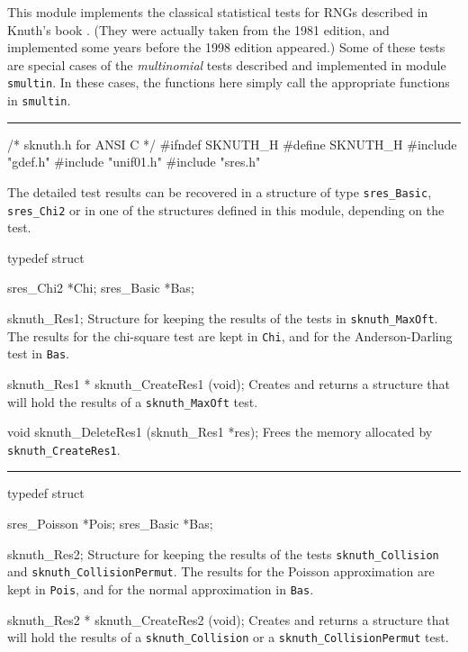 
This module implements the classical statistical tests for RNGs
described in Knuth's book \cite{rKNU81a}.
(They were actually taken from the 1981 edition, and implemented
some years before the 1998 edition \cite{rKNU98a} appeared.)
Some of these tests are special cases of the {\em multinomial\/}
tests described and implemented in module {\tt smultin}.
In these cases, the functions here simply call the appropriate
functions in {\tt smultin}.
\resdef

\bigskip\hrule

\code\hide
/* sknuth.h  for ANSI C */
#ifndef SKNUTH_H
#define SKNUTH_H
\endhide
#include "gdef.h"
#include "unif01.h"
#include "sres.h"
\endcode


\ifdetailed  %


The detailed test results can be recovered in a structure of type
{\tt sres\_Basic}, {\tt sres\_Chi2} or in one of the structures
defined in this module, depending on the test.

\code

typedef struct {

   sres_Chi2 *Chi;
   sres_Basic *Bas;

} sknuth_Res1;
\endcode
 \tab
  Structure for keeping the results of the tests in {\tt sknuth\_MaxOft}.
  The results for the chi-square test are kept in
  {\tt Chi}, and for the Anderson-Darling test in  {\tt Bas}.
 \endtab
\code


sknuth_Res1 * sknuth_CreateRes1 (void);
\endcode
 \tab
  Creates and returns a structure that will hold the results
  of a  {\tt sknuth\_MaxOft} test.
 \endtab
\code


void sknuth_DeleteRes1 (sknuth_Res1 *res);
\endcode
 \tab
  Frees the memory allocated by {\tt sknuth\_CreateRes1}.
 \endtab

\bigskip\hrule\bigskip

\code
typedef struct {

   sres_Poisson *Pois;
   sres_Basic *Bas;

} sknuth_Res2;
\endcode
 \tab
  Structure for keeping the results of the tests {\tt sknuth\_Collision}
  and {\tt sknuth\_CollisionPermut}.
  The results for the Poisson approximation are kept in
  {\tt Pois}, and for the normal approximation in  {\tt Bas}.
 \endtab
\code


sknuth_Res2 * sknuth_CreateRes2 (void);
\endcode
 \tab
  Creates and returns a structure that will hold the results
  of a  {\tt sknuth\_Collision} or a {\tt sknuth\_CollisionPermut} test.
 \endtab
\code


